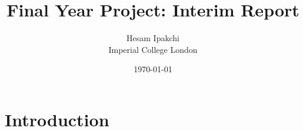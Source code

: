 \documentclass[12pt]{article}
\numberwithin{equation}{section}
\begin{document}
\nocite{*}


\title{\textbf{Final Year Project: Interim Report}}
\author{Hesam Ipakchi\\Imperial College London}
\date{\today}
\clearpage\maketitle
\thispagestyle{empty}


\newpage
\thispagestyle{plain}
\mbox{}


\tableofcontents


\newpage
\thispagestyle{plain}
\mbox{}
\listoffigures


\newpage
\thispagestyle{plain}
\mbox{}


\section {Introduction}
\label{sec:introduction}
\end{document}
